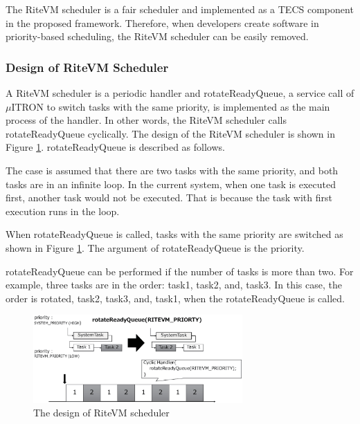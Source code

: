 \documentclass{sig-alternate-05-2015}
\begin{document}
The RiteVM scheduler is a fair scheduler and implemented as a TECS component in the proposed framework.
Therefore, when developers create software in priority-based scheduling, the RiteVM scheduler can be easily removed.

\subsubsection{Design of RiteVM Scheduler}
A RiteVM scheduler is a periodic handler and {\myit rotateReadyQueue}, a service call of $\mu$ITRON to switch tasks with the same priority, is implemented as the main process of the handler.
In other words, the RiteVM scheduler calls {\myit rotateReadyQueue} cyclically.
The design of the RiteVM scheduler is shown in Figure \ref{fig:rotateReadyQueue}. 
{\myit rotateReadyQueue} is described as follows.

The case is assumed that there are two tasks with the same priority, and both tasks are in an infinite loop.
In the current system, when one task is executed first, another task would not be executed.
That is because the task with first execution runs in the loop.

When {\myit rotateReadyQueue} is called, tasks with the same priority are switched as shown in Figure \ref{fig:rotateReadyQueue}.
The argument of {\myit rotateReadyQueue} is the priority.

{\myit rotateReadyQueue} can be performed if the number of tasks is more than two.
For example, three tasks are in the order: task1, task2, and, task3.
In this case, the order is rotated, task2, task3, and, task1, when the {\myit rotateReadyQueue} is called.

\begin{figure}[t]
    \centering
    \includegraphics[width=8cm,clip]{figure/rotateReadyQueue.eps}
    \vspace{1mm}
\caption{The design of RiteVM scheduler}
    \vspace{1mm}
\label{fig:rotateReadyQueue}
\end{figure} 
 
\end{document}
